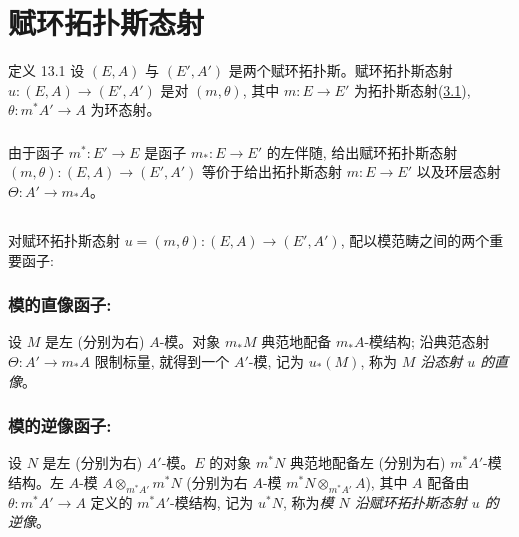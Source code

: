 
\section{赋环拓扑斯态射}

\begin{enonce*}{定义 13.1}
设 $(E,A)$ 与 $(E',A')$ 是两个赋环拓扑斯。赋环拓扑斯态射 $u:(E,A)\rightarrow(E',A')$ 是对 $(m,\theta)$, 其中 $m:E\rightarrow E'$ 为拓扑斯态射\textup{(\hyperref[IV.def3.1]{3.1})}, $\theta:m^{\ast}A'\rightarrow A$ 为环态射。
\end{enonce*}

\setcounter{subsection}{1}
\subsubsection{}
由于函子 $m^{\ast}:E'\rightarrow E$ 是函子 $m_{\ast}:E\rightarrow E'$ 的左伴随, 给出赋环拓扑斯态射 $(m,\theta):(E,A)\rightarrow(E',A')$ 等价于给出拓扑斯态射 $m:E\rightarrow E'$ 以及环层态射 $\Theta:A'\rightarrow m_{\ast}A$。

\subsection{}
对\pageoriginale 赋环拓扑斯态射 $u=(m,\theta):(E,A)\rightarrow(E',A')$, 配以模范畴之间的两个重要函子:

\subsubsection{模的直像函子:}
设 $M$ 是左 (分别为右) $A$-模。对象 $m_{\ast}M$ 典范地配备 $m_{\ast}A$-模结构; 沿典范态射 $\Theta:A'\rightarrow m_{\ast}A$ 限制标量, 就得到一个 $A'$-模, 记为 $u_{\ast}(M)$, 称为 \emph{$M$ 沿态射 $u$ 的直像}。

\subsubsection{模的逆像函子:}
设 $N$ 是左 (分别为右) $A'$-模。$E$ 的对象 $m^{\ast}N$ 典范地配备左 (分别为右) $m^{\ast}A'$-模结构。左 $A$-模 $A\otimes_{m^{\ast}A'}m^{\ast}N$ (分别为右 $A$-模 $m^{\ast}N\otimes_{m^{\ast}A'}A$), 其中 $A$ 配备由 $\theta:m^{\ast}A'\rightarrow A$ 定义的 $m^{\ast}A'$-模结构, 记为 $u^{\ast}N$, 称为\emph{模 $N$ 沿赋环拓扑斯态射 $u$ 的逆像}。

